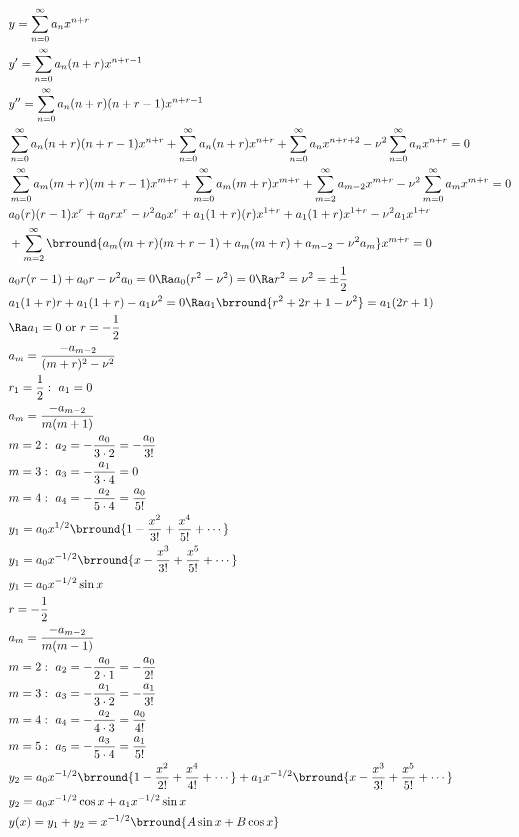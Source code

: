 \begin{align*}
    &y=\sum_{n=0}^\infty a_nx^{n+r}\\
    &y'=\sum_{n=0}^\infty a_n(n+r)x^{n+r-1}\\
    &y''=\sum_{n=0}^\infty a_n(n+r)(n+r-1)x^{n+r-1}\\
    &\sum_{n=0}^\infty a_n(n+r)(n+r-1)x^{n+r}+\sum_{n=0}^\infty a_n(n+r)x^{n+r}+\sum_{n=0}^\infty a_n x^{n+r+2}-\nu^2\sum_{n=0}^\infty a_n x^{n+r}=0\\
    &\sum_{m=0}^\infty a_m(m+r)(m+r-1)x^{m+r}+\sum_{m=0}^\infty a_m(m+r)x^{m+r}+\sum_{m=2}^\infty a_{m-2}x^{m+r}-\nu^2\sum_{m=0}^\infty a_m x^{m+r}=0\\
    &a_0(r)(r-1)x^r+a_0rx^r-\nu^2 a_0 x^r+a_1(1+r)(r)x^{1+r}+a_1(1+r)x^{1+r}-\nu^2a_1 x^{1+r}\\
    &+\sum_{m=2}^\infty \brround{a_m(m+r)(m+r-1)+a_m(m+r)+a_{m-2}-\nu^2a_m}x^{m+r}=0\\
    &a_0r(r-1)+a_0r-\nu^2a_0=0\Ra a_0(r^2-\nu^2)=0\Ra r^2=\nu^2=\pm\frac{1}{2}\\
    &a_1(1+r)r+a_1(1+r)-a_1\nu^2=0\Ra a_1\brround{r^2+2r+1-\nu^2}=a_1(2r+1)\\
    &\Ra a_1=0\text{ or }r=-\frac{1}{2}\\
    &a_m=\frac{-a_{m-2}}{(m+r)^2-\nu^2}\\
    &r_1=\frac{1}{2}:\ a_1=0\\
    &a_m=\frac{-a_{m-2}}{m(m+1)}\\
    &m=2:\ a_2=-\frac{a_0}{3\cdot2}=-\frac{a_0}{3!}\\
    &m=3:\ a_3=-\frac{a_1}{3\cdot4}=0\\
    &m=4:\ a_4=-\frac{a_2}{5\cdot4}=\frac{a_0}{5!}\\
    &y_1=a_0x^{1/2}\brround{1-\frac{x^2}{3!}+\frac{x^4}{5!}+\cdots}\\
    &y_1=a_0x^{-1/2}\brround{x-\frac{x^3}{3!}+\frac{x^5}{5!}+\cdots}\\
    &y_1=a_0x^{-1/2}\sin x\\
    &r=-\frac{1}{2}\\
    &a_m=\frac{-a_{m-2}}{m(m-1)}\\
    &m=2:\ a_2=-\frac{a_0}{2\cdot1}=-\frac{a_0}{2!}\\
    &m=3:\ a_3=-\frac{a_1}{3\cdot2}=-\frac{a_1}{3!}\\
    &m=4:\ a_4=-\frac{a_2}{4\cdot3}=\frac{a_0}{4!}\\
    &m=5:\ a_5=-\frac{a_3}{5\cdot4}=\frac{a_1}{5!}\\
    &y_2=a_0x^{-1/2}\brround{1-\frac{x^2}{2!}+\frac{x^4}{4!}+\cdots}+a_1x^{-1/2}\brround{x-\frac{x^3}{3!}+\frac{x^5}{5!}+\cdots}\\
    &y_2=a_0x^{-1/2}\cos x+a_1x^{-1/2}\sin x\\
    &y(x)=y_1+y_2=x^{-1/2}\brround{A\sin x+B\cos x}
\end{align*}
